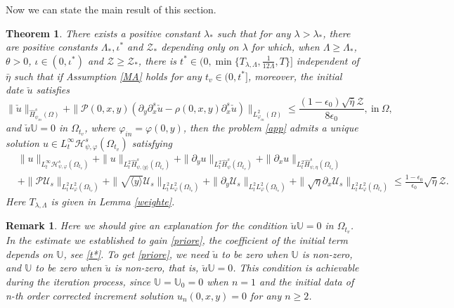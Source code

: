 \documentclass{amsart}
\numberwithin{equation}{section}
\newtheorem{theorem}{Theorem}[section]
\newtheorem{remark}{Remark}[section]
\newcommand\y{{{\langle y \rangle}}}
\begin{document}
Now we can state the main result of this section.
\begin{theorem}\label{wpae}
There exists a positive constant $\lambda_{*}$ such that for any $\lambda>\lambda_{*}$, there are positive constants $\Lambda_{*}, \iota^{*}$ and $\mathcal{Z}_{*}$ depending only on $\lambda$ for which, when $\Lambda\geq\Lambda_{*}$, $\theta>0$, $\iota\in(0,\iota^{*})$ and $\mathcal{Z}\geq\mathcal{Z}_{*}$, there is $t^{*}\in(0,\min\{T_{\lambda,\Lambda},\frac{1}{12\Lambda},T\}]$ independent of $\bar{\eta}$ such that if Assumption \ref{MA} holds for any $t_{v}\in(0,t^{*}]$, moreover, the initial date $\check{u}$ satisfies
$$\|\check{u}\|_{\hat{H}_{\psi_{in}}^{s}(\Omega)}
 +\|\mathcal{P}(0,x,y)(\partial_{y}\partial_{x}^{s}\check{u}-\rho(0,x,y)\partial_{x}^{s}\check{u})\|_{L_{\varphi_{in}}^{2}(\Omega)}
\leq \frac{(1-\epsilon_{0})\sqrt{\bar{\eta}}\mathcal{Z}}{8\epsilon_{0}},~\text{in}~\Omega,$$
and $\check{u}\mathbb{U}=0$ in $\Omega_{t_{v}}$, where $\varphi_{in}=\varphi(0,y)$, then the problem \eqref{app} admits a unique solution
$u\in L_{t}^{\infty}\mathcal{H}_{\psi,\varphi}^{s}(\Omega_{t_{v}})$ satisfying
\begin{align}\label{priore}
& \|u\|_{L_{t}^{\infty}\mathcal{H}_{\psi,\varphi}^{s}(\Omega_{t_{v}})}
 +\|u\|_{L_{t}^{2}\hat{H}_{\psi,\y}^{s}(\Omega_{t_{v}})}
 +\|\partial_{y}u\|_{L_{t}^{2}\hat{H}_{\psi}^{s}(\Omega_{t_{v}})}
 +\|\partial_{x}u\|_{L_{t}^{2}\hat{H}_{\psi,\eta}^{s}(\Omega_{t_{v}})}\\
&+\|\mathcal{P}\mathcal{U}_{s}\|_{L_{t}^{2}L_{\varphi}^{2}(\Omega_{t_{v}})}
 +\|\sqrt{\y}\mathcal{U}_{s}\|_{L_{t}^{2}L_{\varphi}^{2}(\Omega_{t_{v}})}
 +\|\partial_{y}\mathcal{U}_{s}\|_{L_{t}^{2}L_{\varphi}^{2}(\Omega_{t_{v}})}
 +\|\sqrt{\eta}\partial_{x}\mathcal{U}_{s}\|_{L_{t}^{2}L_{\varphi}^{2}(\Omega_{t_{v}})}
\leq \frac{1-\epsilon_{0}}{\epsilon_{0}}\sqrt{\bar{\eta}}\mathcal{Z}.\nonumber
\end{align}
Here $T_{\lambda,\Lambda}$ is given in Lemma \ref{weighte}.
\end{theorem}

\begin{remark}
Here we should give an explanation for the condition $\check{u}\mathbb{U}=0$ in $\Omega_{t_{v}}$. In the estimate we established to gain \eqref{priore}, the coefficient of the initial term depends on $\mathbb{U}$, see \eqref{t*}. To get \eqref{priore}, we need $\check{u}$ to be zero when $\mathbb{U}$ is non-zero, and $\mathbb{U}$ to be zero when $\check{u}$ is non-zero, that is, $\check{u}\mathbb{U}=0$.
This condition is achievable during the iteration process, since $\mathbb{U}=\mathbb{U}_{0}=0$ when $n=1$ and the initial data of n-th order corrected increment solution $u_{n}(0,x,y)=0$ for any $n\geq 2$.
\end{remark}
\end{document}
